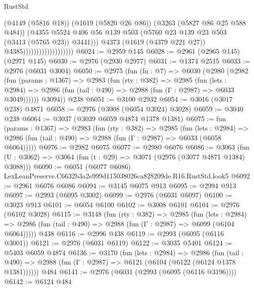 \begin{lexlean}{RustStd}
\begin{coremodule}
                                            (@4149 (@5816 @18))
                                            (@1619 (@5820 @26 @86))
                                            (@3263 (@5827 @86 @25 @588 @484))
                                            (@4355
                                              @5524
                                              @406
                                              @56
                                              @139
                                              @503
                                              (@5760 @23 @139 @23 @503 (@3413 (@5765 @23)) @3441)))
                                          @4373
                                          (@1619 (@4379 @221 @27))
                                          @4385)))))))))))))))))))
@6024 := @2959 @145
@6028 := @2961 (@2965 @145) (@2971 @145)
@6030 := @2976 (@2930 @2977)
@6031 := @1374 @2515
@6033 := @2976 (@6031 @3004)
@6050 := @2975
    (fun (fn : @7) =>
    @6030
      (@2980
        (@2982
          (fun (params : @1367) =>
          @2983
            (fun (rty : @382) =>
            @2985
              (fun (lets : @2984) =>
              @2986 (fun (tail : @490) => @2988 (fun (Γ : @2987) => @6033 @3049))))))
        @3094))
    @238
@6051 := @3100 @2932
@6054 := @3016 (@3017 @238) @4871
@6058 := @2976 (@3008 (@6054 @3024) @3028)
@6059 := @3040 @238
@6064 := @3037 (@3039 @6059 @4874 @1378 @1381)
@6075 := fun (params : @1367) =>
  @2983
    (fun (rty : @382) =>
    @2985
      (fun (lets : @2984) =>
      @2986 (fun (tail : @490) => @2988 (fun (Γ : @2987) => @6033 (@6058 @6064)))))
@6076 := @2982 @6075
@6077 := @2980 @6076
@6086 := @3063 (fun (U : @3062) => @3064 (fun (t : @29) => @3071 (@2976 (@3077 @4871 @1384) @3088)))
@6090 := @6051 (@6077 @6086) LexLeanPreserve.C6632b3a2e999d115038026ca828209de.R16.RustStd.look5
@6092 := @2961 @6076 @6086
@6094 := @3145 @6075 @913
@6095 := @2994 @913
@6097 := @2993 (@6095 @3002)
@6099 := @2976 (@6031 @6097)
@6100 := @3023 @913
@6101 := @6054 @6100
@6102 := @3008 @6101
@6104 := @2976 (@6102 @3028)
@6115 := @3148
    (fun (rty : @382) =>
    @2985
      (fun (lets : @2984) =>
      @2986 (fun (tail : @490) => @2988 (fun (Γ : @2987) => @6099 (@6104 @6064)))))
    @438
@6116 := @2996 @438
@6119 := @2993 (@6095 (@6116 @3001))
@6121 := @2976 (@6031 @6119)
@6122 := @3035 @5401
@6124 := @5403 @6059 @4874
@6136 := @3170
    (fun (lets : @2984) =>
    @2986
      (fun (tail : @490) => @2988 (fun (Γ : @2987) => @6121 (@6104 (@6122 (@6124 @1378 @1381))))))
    @484
@6141 := @2976 (@6031 (@2993 (@6095 (@6116 @3196))))
@6142 := @6124 @484

\end{coremodule}
\end{lexlean}
